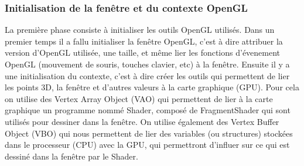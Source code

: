 \subsubsection{Initialisation de la fenêtre et du contexte OpenGL}
La première phase consiste à initialiser les outils OpenGL utilisés. Dans un premier temps il a fallu initialiser la fenêtre OpenGL, c'est à dire attribuer la version d'OpenGL utilisée, une taille, et même lier les fonctions d'évenement OpenGL (mouvement de souris, touches clavier, etc) à la fenêtre. Ensuite il y a une initialisation du contexte, c'est à dire créer les outils qui permettent de lier les points 3D, la fenêtre et d'autres valeurs à la carte graphique (GPU). Pour cela on utilise des Vertex Array Object (VAO) qui permettent de lier à la carte graphique un programme nommé Shader, composé de FragmentShader qui sont utilisés pour dessiner dans la fenêtre. On utilise également des Vertex Buffer Object (VBO) qui nous permettent de lier des variables (ou structures) stockées dans le processeur (CPU) avec la GPU, qui permettront d'influer sur ce qui est dessiné dans la fenêtre par le Shader. \\

